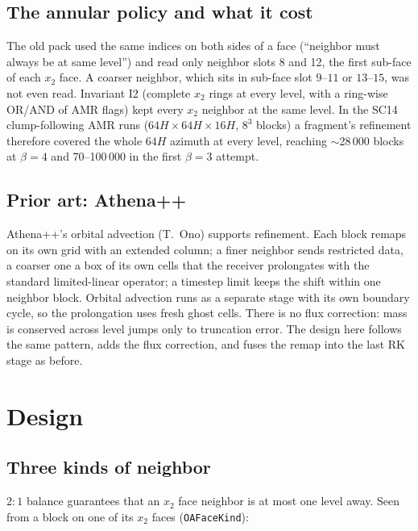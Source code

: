 \documentclass[11pt]{article}
\newcommand{\fn}[1]{\texttt{\small #1}}
\begin{document}
\subsection{The annular policy and what it cost}
The old pack used the same indices on both sides of a face (``neighbor must always be at
same level'') and read only neighbor slots 8 and 12, the first sub-face of each $x_2$ face.
A coarser neighbor, which sits in sub-face slot $9$--$11$ or $13$--$15$, was not even
read. Invariant I2 (complete $x_2$ rings at every level, with a ring-wise OR/AND of AMR
flags) kept every $x_2$ neighbor at the same level. In the SC14 clump-following AMR
runs ($64H\times64H\times16H$, $8^3$ blocks) a fragment's refinement therefore covered the
whole $64H$ azimuth at every level, reaching $\sim$28\,000 blocks at $\beta = 4$ and
70--100\,000 in the first $\beta = 3$ attempt.

\subsection{Prior art: Athena++}
Athena++'s orbital advection (T.~Ono) supports refinement. Each block remaps on its own
grid with an extended column; a finer neighbor sends restricted data, a coarser one a box
of its own cells that the receiver prolongates with the standard limited-linear
operator; a timestep limit keeps the shift within one neighbor block. Orbital advection
runs as a separate stage with its own boundary cycle, so the prolongation uses fresh
ghost cells. There is no flux correction: mass is conserved across level jumps only to
truncation error. The design here follows the same pattern, adds the flux correction,
and fuses the remap into the last RK stage as before.

\section{Design}
\label{sec:design}

\subsection{Three kinds of neighbor}
$2{:}1$ balance guarantees that an $x_2$ face neighbor is at most one level away. Seen
from a block on one of its $x_2$ faces (\fn{OAFaceKind}):
\end{document}
